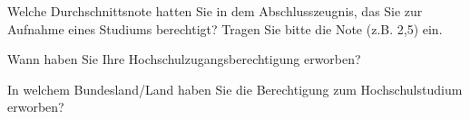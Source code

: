 \separate

\begin{choicequestion}[3]{Welche Durchschnittsnote hatten Sie in dem Abschlusszeugnis, das Sie zur Aufnahme eines Studiums berechtigt?
\newline\footnotesize{Tragen Sie bitte die Note (z.B. 2,5) ein.}}
\end{choicequestion}

\separate


\begin{choicequestion}[3]{Wann haben Sie Ihre Hochschulzugangsberechtigung erworben?}
\end{choicequestion}

\separate

\begin{choicequestion}[1]{In welchem Bundesland/Land haben Sie die Berechtigung zum Hochschulstudium erworben?}
\end{choicequestion}

\separate


\separate

